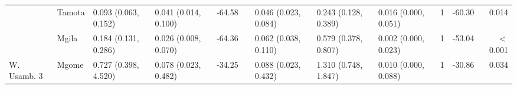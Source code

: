 \begin{tabular}{lllllllllclr}
            & Tamota         & 0.093 (0.063, 0.152)   & 0.041 (0.014, 0.100)   & -64.58   & &   0.046 (0.023, 0.084)   & 0.243 (0.128, 0.389)   & 0.016 (0.000, 0.051)   & 1   & -60.30   & 0.014\\
            & Mgila          & 0.184 (0.131, 0.286)   & 0.026 (0.008, 0.070)   & -64.36   & &   0.062 (0.038, 0.110)   & 0.579 (0.378, 0.807)   & 0.002 (0.000, 0.023)   & 1   & -53.04   & $<$0.001\\
\cmidrule{2-12}
W. Usamb. 3 & Mgome          & 0.727 (0.398, 4.520)   & 0.078 (0.023, 0.482)   & -34.25   & &   0.088 (0.023, 0.432)   & 1.310 (0.748, 1.847)   & 0.010 (0.000, 0.088)   & 1   & -30.86   & 0.034\\
\bottomrule
\end{tabular}